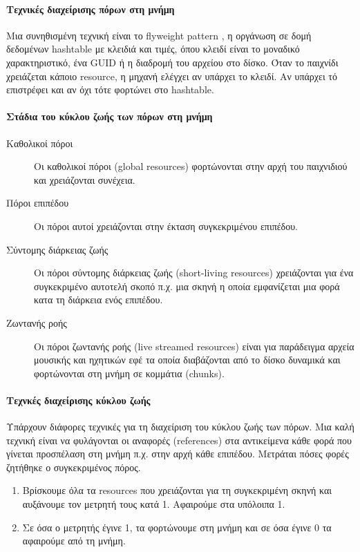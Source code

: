 \paragraph{Τεχνικές διαχείρισης πόρων στη μνήμη}
Μια συνηθισμένη τεχνική είναι το flyweight pattern \cite{Gamma:1995:DPE:186897}, η οργάνωση σε δομή δεδομένων hashtable με κλειδιά και τιμές, όπου κλειδί είναι το μοναδικό χαρακτηριστικό, ένα GUID ή η διαδρομή του αρχείου στο δίσκο. Όταν το παιχνίδι χρειάζεται κάποιο resource, η μηχανή ελέγχει αν υπάρχει το κλειδί. Αν υπάρχει τό επιστρέφει και αν όχι τότε φορτώνει στο hashtable.

\paragraph{Στάδια του κύκλου ζωής των πόρων στη μνήμη}
\begin{description}
\item [Καθολικοί πόροι] Οι καθολικοί πόροι (global resources) φορτώνονται στην αρχή του παιχνιδιού και χρειάζονται συνέχεια.
\item [Πόροι επιπέδου] Οι πόροι αυτοί χρειάζονται στην έκταση συγκεκριμένου επιπέδου.
\item [Σύντομης διάρκειας ζωής] Οι πόροι σύντομης διάρκειας ζωής (short-living resources) χρειάζονται για ένα συγκεκριμένο αυτοτελή σκοπό π.χ. μια σκηνή η οποία εμφανίζεται μια φορά κατα τη διάρκεια ενός επιπέδου.
\item [Zωντανής ροής] Οι πόροι ζωντανής ροής (live streamed resources) είναι για παράδειγμα αρχεία μουσικής και ηχητικών εφέ τα οποία διαβάζονται από το δίσκο δυναμικά και φορτώνονται στη μνήμη σε κομμάτια (chunks).
\end{description}

\paragraph{Τεχνκές διαχείρισης κύκλου ζωής}
Υπάρχουν διάφορες τεχνικές για τη διαχείριση του κύκλου ζωής των πόρων. Μια καλή τεχνική είναι να φυλάγονται οι αναφορές (references) στα αντικείμενα κάθε φορά που γίνεται προσπέλαση στη μνήμη π.χ. στην αρχή κάθε επιπέδου.
Μετράται πόσες φορές ζητήθηκε ο συγκεκριμένος πόρος.  
\begin{enumerate}
	\item Βρίσκουμε όλα τα resources που χρειάζονται για τη συγκεκριμένη σκηνή και αυξάνουμε τον μετρητή τους κατά 1. Αφαιρούμε στα υπόλοιπα 1.
	\item Σε όσα ο μετρητής έγινε 1, τα φορτώνουμε στη μνήμη και σε όσα έγινε 0 τα αφαιρούμε από τη μνήμη.
\end{enumerate}

